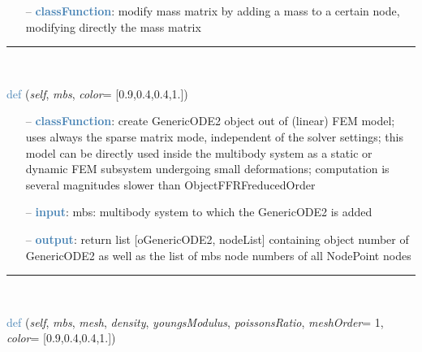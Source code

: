 \begin{itemize}[leftmargin=1.4cm]
\begin{itemize}[leftmargin=1.4cm]
\begin{itemize}[leftmargin=0.5cm]
\begin{itemize}[leftmargin=1.4cm]
\begin{itemize}[leftmargin=1.4cm]
\begin{itemize}[leftmargin=0.5cm]
\setlength{\itemindent}{0.7cm}
\begin{itemize}[leftmargin=0.7cm]
  \item[--]  \textcolor{steelblue}{\bf classFunction}: modify mass matrix by adding a mass to a certain node, modifying directly the mass matrix\vspace{12pt}\end{itemize}
%
\noindent\rule{8cm}{0.75pt}\vspace{1pt} \\ 
\begin{flushleft}
\noindent \textcolor{steelblue}{def {\bf {}}}\label{sec:FEM:FEMinterface:CreateLinearFEMObjectGenericODE2}
({\it self}, {\it mbs}, {\it color}= [0.9,0.4,0.4,1.])
\end{flushleft}
\setlength{\itemindent}{0.7cm}
\begin{itemize}[leftmargin=0.7cm]
  \item[--]  \textcolor{steelblue}{\bf classFunction}: create GenericODE2 object out of (linear) FEM model; uses always the sparse matrix mode, independent of the solver settings; this model can be directly used inside the multibody system as a static or dynamic FEM subsystem undergoing small deformations; computation is several magnitudes slower than ObjectFFRFreducedOrder  \item[--]  \textcolor{steelblue}{\bf input}: mbs: multibody system to which the GenericODE2 is added  \item[--]  \textcolor{steelblue}{\bf output}: return list [oGenericODE2, nodeList] containing object number of GenericODE2 as well as the list of mbs node numbers of all NodePoint nodes\vspace{12pt}\end{itemize}
%
\noindent\rule{8cm}{0.75pt}\vspace{1pt} \\ 
\begin{flushleft}
\noindent \textcolor{steelblue}{def {\bf {}}}\label{sec:FEM:FEMinterface:CreateNonlinearFEMObjectGenericODE2NGsolve}
({\it self}, {\it mbs}, {\it mesh}, {\it density}, {\it youngsModulus}, {\it poissonsRatio}, {\it meshOrder}= 1, {\it color}= [0.9,0.4,0.4,1.])
\end{flushleft}
\setlength{\itemindent}{0.7cm}
\begin{itemize}[leftmargin=0.7cm]

\end{itemize}
\end{itemize}
\end{itemize}
\end{itemize}
\end{itemize}
\end{itemize}
\end{itemize}
